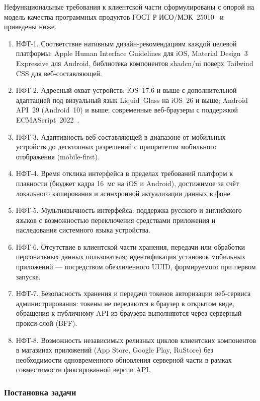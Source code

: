 Нефункциональные требования к клиентской части сформулированы с опорой на модель качества программных продуктов ГОСТ Р ИСО/МЭК~25010~\cite{gost-25010-2015} и приведены ниже.

\begin{enumerate}
  \item НФТ-1. Соответствие нативным дизайн-рекомендациям каждой целевой платформы: Apple Human Interface Guidelines для iOS, Material Design~3 Expressive для Android, библиотека компонентов shadcn/ui поверх Tailwind CSS для веб-составляющей.
  \item НФТ-2. Адресный охват устройств: iOS~17.6 и выше с дополнительной адаптацией под визуальный язык Liquid~Glass на iOS~26 и выше; Android API~29 (Android~10) и выше; современные веб-браузеры с поддержкой ECMAScript~2022~\cite{ecma-262}.
  \item НФТ-3. Адаптивность веб-составляющей в диапазоне от мобильных устройств до десктопных разрешений с приоритетом мобильного отображения (mobile-first).
  \item НФТ-4. Время отклика интерфейса в пределах требований платформ к плавности (бюджет кадра 16~мс на iOS и Android), достижимое за счёт локального кэширования и асинхронной актуализации данных в фоне.
  \item НФТ-5. Мультиязычность интерфейса: поддержка русского и английского языков с возможностью переключения средствами приложения и наследования системного языка устройства.
  \item НФТ-6. Отсутствие в клиентской части хранения, передачи или обработки персональных данных пользователя; идентификация установок мобильных приложений --- посредством обезличенного UUID, формируемого при первом запуске.
  \item НФТ-7. Безопасность хранения и передачи токенов авторизации веб-сервиса администрирования: токены не передаются в браузер в открытом виде, обращения к публичному API из браузера выполняются через серверный прокси-слой (BFF).
  \item НФТ-8. Возможность независимых релизных циклов клиентских компонентов в магазинах приложений (App Store, Google Play, RuStore) без необходимости одновременного обновления серверной части в рамках совместимости фиксированной версии API.
\end{enumerate}

\subsubsection{Постановка задачи}

